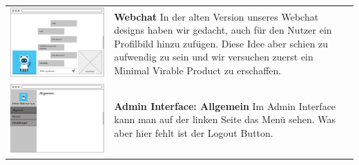 \begin{tabular}{C{6cm}  L{7cm}}
    \includegraphics[width=\linewidth]{bilder/old vers. UI Design/WebChat.png} & \textbf{Webchat} \newline 
    In der alten Version unseres Webchat designs haben wir gedacht, auch für den
    Nutzer ein Profilbild hinzu zufügen. Diese Idee aber schien zu aufwendig zu sein und wir versuchen
    zuerst ein Minimal Virable Product zu erschaffen. \\
    \includegraphics[width=\linewidth]{bilder/old vers. UI Design/Admin Interface Allgemein.png} & \textbf{Admin Interface: Allgemein} \newline 
    Im Admin Interface kann man auf der linken Seite das Menü sehen. Was aber hier fehlt ist der Logout Button.

\end{tabular}
